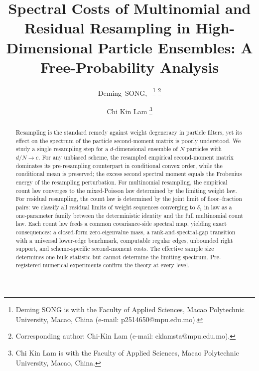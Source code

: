 \documentclass[lettersize,journal]{IEEEtran}
\theoremstyle{remark}
\begin{document}
\title{Spectral Costs of Multinomial and Residual Resampling in High-Dimensional Particle Ensembles: A Free-Probability Analysis}

\author{Deming~SONG,~%
\thanks{Deming SONG is with the Faculty of Applied Sciences, Macao Polytechnic University, Macao, China (e-mail: p2514650@mpu.edu.mo).}%
\thanks{Corresponding author: Chi-Kin Lam (e-mail: cklamsta@mpu.edu.mo).}%
\hspace{0.5 cm} 
\and
\hspace{0.5 cm}
Chi Kin Lam%
\thanks{Chi Kin Lam is with the Faculty of Applied Sciences, Macao Polytechnic University, Macao, China.}}%


\maketitle

\begin{abstract}
Resampling is the standard remedy against weight degeneracy in particle filters, yet its effect on the spectrum of the particle second-moment matrix is poorly understood. We study a single resampling step for a $d$-dimensional ensemble of $N$ particles with $d/N\to c$. For any unbiased scheme, the resampled empirical second-moment matrix dominates its pre-resampling counterpart in conditional convex order, while the conditional mean is preserved; the excess second spectral moment equals the Frobenius energy of the resampling perturbation. For multinomial resampling, the empirical count law converges to the mixed-Poisson law determined by the limiting weight law. For residual resampling, the count law is determined by the joint limit of floor--fraction pairs: we classify all residual limits of weight sequences converging to $\delta_1$ in law as a one-parameter family between the deterministic identity and the full multinomial count law. Each count law feeds a common covariance-side spectral map, yielding exact consequences: a closed-form zero-eigenvalue mass, a rank-and-spectral-gap transition with a universal lower-edge benchmark, computable regular edges, unbounded right support, and scheme-specific second-moment costs. The effective sample size determines one bulk statistic but cannot determine the limiting spectrum. Pre-registered numerical experiments confirm the theory at every level.
\end{abstract}
\end{document}
